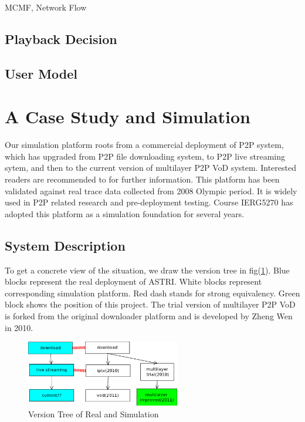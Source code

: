 \documentclass[11pt,a4paper]{article}
\begin{document}
MCMF, Network Flow 



\subsection{Playback Decision}


\subsection{User Model}



\section{A Case Study and Simulation }
\label{sec:case}

Our simulation platform roots from a commercial deployment
of P2P system\cite{astri}, which has upgraded from P2P file downloading 
system, to P2P live streaming sytem, and then to the current 
version of multilayer P2P VoD system. Interested
readers are recommended to \cite{huang2010simulation} for 
further information. This platform has been validated against 
real trace data collected from 2008 Olympic period. It is 
widely used in P2P related research and pre-deployment testing. 
Course IERG5270\cite{ierg5270} has adopted this platform 
as a simulation foundation for several years. 

\subsection{System Description}

To get a concrete view of the situation, we draw the 
version tree in fig(\ref{fig:simu_version_tree}). 
Blue blocks represent the real deployment of ASTRI. 
White blocks represent corresponding simulation platform.
Red dash stands for strong equivalency. 
Green block shows the position of this project. 
The trial version of multilayer P2P VoD is forked from the 
original downloader platform and is developed by 
Zheng Wen in 2010. 

\begin{figure}[htb]
	\centering
	\includegraphics[width=0.6\textwidth]{../fig/version_tree.png}
	\caption{Version Tree of Real and Simulation}
	\label{fig:simu_version_tree}
\end{figure}
\end{document}
